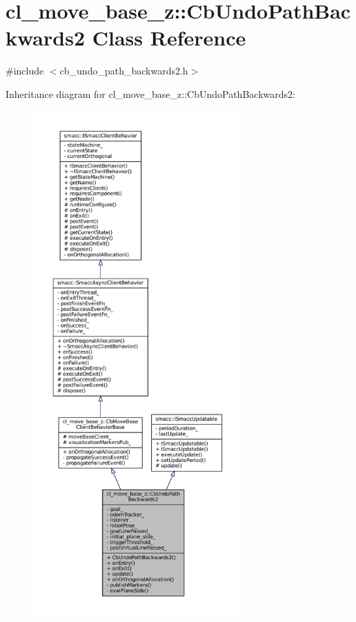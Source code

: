 \hypertarget{classcl__move__base__z_1_1CbUndoPathBackwards2}{}\section{cl\+\_\+move\+\_\+base\+\_\+z\+:\+:Cb\+Undo\+Path\+Backwards2 Class Reference}
\label{classcl__move__base__z_1_1CbUndoPathBackwards2}


{\ttfamily \#include $<$cb\+\_\+undo\+\_\+path\+\_\+backwards2.\+h$>$}



Inheritance diagram for cl\+\_\+move\+\_\+base\+\_\+z\+:\+:Cb\+Undo\+Path\+Backwards2\+:
\nopagebreak
\begin{figure}[H]
\begin{center}
\leavevmode
\includegraphics[height=550pt]{classcl__move__base__z_1_1CbUndoPathBackwards2__inherit__graph}
\end{center}
\end{figure}


